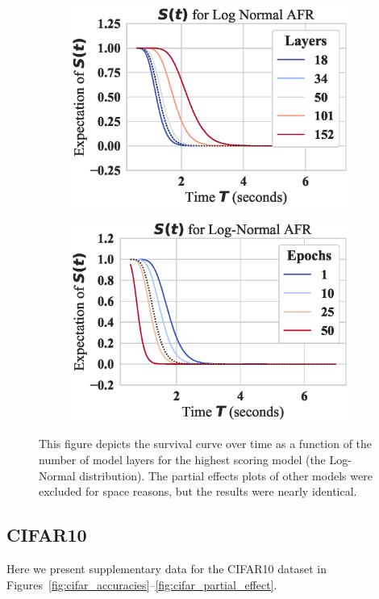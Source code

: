 \begin{figure}[!h]
    \begin{subfigure}
        \centering\includegraphics[width=.45\textwidth]{cifar/log_normal_layers_partial_effect.eps}
    \end{subfigure}
    \begin{subfigure}
        \centering\includegraphics[width=.45\textwidth]{cifar/log_normal_epochs_partial_effect.eps}
    \end{subfigure}
    \caption{This figure depicts the survival curve over time as a function of the number of model layers for the highest scoring model (the Log-Normal distribution). The partial effects plots of other models were excluded for space reasons, but the results were nearly identical.}
    \label{fig:mnist_partial_effect}
\end{figure}





\clearpage
\subsection{CIFAR10}
Here we present supplementary data for the CIFAR10 dataset in Figures~\ref{fig:cifar_accuracies}--\ref{fig:cifar_partial_effect}.


